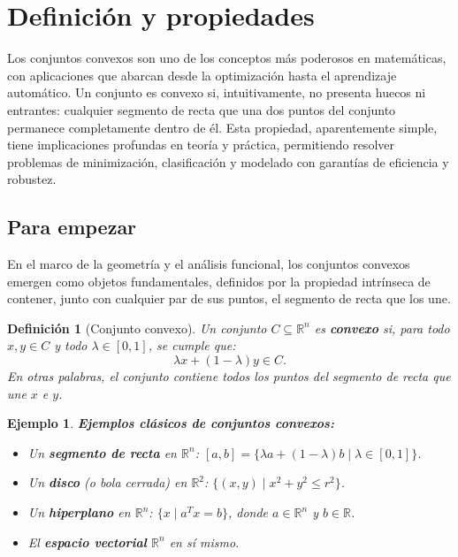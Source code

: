 \documentclass[12pt]{book}
\newtheorem{definition}{Definición}
\newtheorem{ex}{Ejemplo}
\theoremstyle{definition}
\theoremstyle{plain}
\theoremstyle{remark}
\begin{document}
\section{Definición y propiedades}

Los conjuntos convexos son uno de los conceptos más %
poderosos en matemáticas, con aplicaciones que abarcan desde la optimización hasta el aprendizaje automático. Un conjunto es convexo si, intuitivamente, no presenta huecos ni entrantes: cualquier segmento de recta que una dos puntos del conjunto permanece completamente dentro de él. Esta propiedad, aparentemente simple, tiene implicaciones profundas en teoría y práctica, permitiendo resolver problemas de minimización, clasificación y modelado con garantías de eficiencia y robustez.

\subsection{Para empezar}

En el marco de la geometría y el análisis funcional, los conjuntos convexos emergen como objetos fundamentales, definidos por la propiedad intrínseca de contener, junto con cualquier par de sus puntos, el segmento de recta que los une. %

\begin{definition}[Conjunto convexo]
    Un conjunto \( C \subseteq \mathbb{R}^n \) es \textbf{convexo} si, para todo \( x, y \in C \) y todo \( \lambda \in [0,1] \), se cumple que:
    \[
    \lambda x + (1-\lambda) y \in C.
    \]
    En otras palabras, el conjunto contiene todos los puntos del segmento de recta que une \( x \) e \( y \).
\end{definition}

\begin{ex}
\textbf{\textit{Ejemplos clásicos de conjuntos convexos:}}
\begin{itemize}
    \item Un \textbf{segmento de recta} en \( \mathbb{R}^n \): \([a, b] = \{ \lambda a + (1-\lambda) b \mid \lambda \in [0,1] \}\).
    \item Un \textbf{disco} (o bola cerrada) en \( \mathbb{R}^2 \): \( \{ (x,y) \mid x^2 + y^2 \leq r^2 \} \).
    \item Un \textbf{hiperplano} en \( \mathbb{R}^n \): \( \{ x \mid a^T x = b \} \), donde \( a \in \mathbb{R}^n \) y \( b \in \mathbb{R} \).
    \item El \textbf{espacio vectorial} \( \mathbb{R}^n \) en sí mismo.
\end{itemize}
\end{ex}
\end{document}
